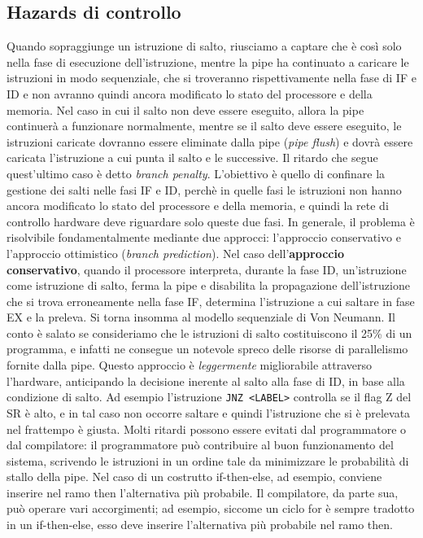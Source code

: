 \subsection{Hazards di controllo}
Quando sopraggiunge un istruzione di salto, riusciamo a captare che è così solo nella fase di esecuzione dell'istruzione, mentre la pipe ha continuato a caricare le istruzioni in modo sequenziale, che si troveranno rispettivamente nella fase di IF e ID e non avranno quindi ancora modificato lo stato del processore e della memoria. Nel caso in cui il salto non deve essere eseguito, allora la pipe continuerà a funzionare normalmente, mentre se il salto deve essere eseguito, le istruzioni caricate dovranno essere eliminate dalla pipe (\textit{pipe flush}) e dovrà essere caricata l'istruzione a cui punta il salto e le successive. Il ritardo che segue quest'ultimo caso è detto \textit{branch penalty}. L'obiettivo è quello di confinare la gestione dei salti nelle fasi IF e ID, perchè in quelle fasi le istruzioni non hanno ancora modificato lo stato del processore e della memoria, e quindi la rete di controllo hardware deve riguardare solo queste due fasi.
In generale, il problema è risolvibile fondamentalmente mediante due approcci: l'approccio conservativo e l'approccio ottimistico (\textit{branch prediction}).
Nel caso dell'\textbf{approccio conservativo}, quando il processore interpreta, durante la fase ID, un'istruzione come istruzione di salto, ferma la pipe e disabilita la propagazione dell'istruzione che si trova erroneamente nella fase IF, determina l'istruzione a cui saltare in fase EX e la preleva. Si torna insomma al modello sequenziale di Von Neumann. Il conto è salato se consideriamo che le istruzioni di salto costituiscono il 25\% di un programma, e infatti ne consegue un notevole spreco delle risorse di parallelismo fornite dalla pipe. Questo approccio è \textit{leggermente} migliorabile attraverso l'hardware, anticipando la decisione inerente al salto alla fase di ID, in base alla condizione di salto. Ad esempio l'istruzione \lstinline|JNZ <LABEL>| controlla se il flag Z del SR è alto, e in tal caso non occorre saltare e quindi l'istruzione che si è prelevata nel frattempo è giusta. Molti ritardi possono essere  evitati dal programmatore o dal compilatore: il programmatore può contribuire al buon funzionamento del sistema, scrivendo le istruzioni in un ordine tale da minimizzare le probabilità di stallo della pipe. Nel caso di un costrutto if-then-else, ad esempio, conviene inserire nel ramo then l'alternativa più probabile. Il compilatore, da parte sua, può operare vari accorgimenti; ad esempio, siccome un ciclo for è sempre tradotto in un if-then-else, esso deve inserire l'alternativa più probabile nel ramo then.
